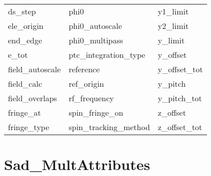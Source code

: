 \begin{tabular}{lll}
ds_step                     & phi0                        & y1_limit                    \\
ele_origin                  & phi0_autoscale              & y2_limit                    \\
end_edge                    & phi0_multipass              & y_limit                     \\
e_tot                       & ptc_integration_type        & y_offset                    \\
field_autoscale             & reference                   & y_offset_tot                \\
field_calc                  & ref_origin                  & y_pitch                     \\
field_overlaps              & rf_frequency                & y_pitch_tot                 \\
fringe_at                   & spin_fringe_on              & z_offset                    \\
fringe_type                 & spin_tracking_method        & z_offset_tot                \\
 \bottomrule
 \end{tabular}
 \vfill
 
 \section{Sad_MultAttributes}
 \label{s:list.sad.mult}
 
